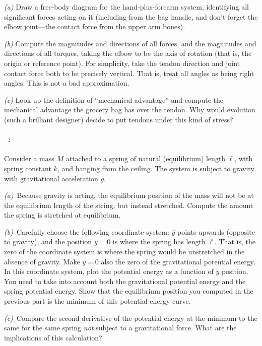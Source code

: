 \documentclass[12pt]{article}
\begin{document}
\textsl{(a)} Draw a free-body diagram for the hand-plus-forearm
system, identifying all significant forces acting on it (including
from the bag handle, and don't forget the elbow joint---the contact
force from the upper arm bones).

\textsl{(b)} Compute the magnitudes and directions of all forces, and
the magnitudes and directions of all torques, taking the elbow to be
the axis of rotation (that is, the origin or reference point).  For
simplicity, take the tendon direction and joint contact force both to
be precisely vertical.  That is, treat all angles as being right
angles.  This is not a bad approximation.

\textsl{(c)} Look up the definition of ``mechanical advantage'' and
compute the mechanical advantage the grocery bag has over the tendon.
Why would evolution (such a brilliant designer) decide to put tendons
under this kind of stress?

\paragraph{\problemname~\theproblem:}%
Consider a mass $M$ attached to a spring of natural (equilibrium)
length $\ell$, with spring constant $k$, and hanging from the
ceiling. The system is subject to gravity with gravitational
acceleration $g$.

\textsl{(a)}~Because gravity is acting, the equilibrium position of
the mass will not be at the equilibrium length of the string, but
instead stretched. Compute the amount the spring is stretched at
equilibrium.

\textsl{(b)}~Carefully choose the following coordinate system:
$\hat{y}$ points upwards (opposite to gravity), and the position $y=0$
is where the spring has length $\ell$. That is, the zero of the
coordinate system is where the spring would be unstretched in the
absence of gravity. Make $y=0$ also the zero of the gravitational
potential energy. In this coordinate system, plot the potential energy
as a function of $y$ position. You need to take into account both the
gravitational potential energy and the spring potential energy. Show
that the equilibrium position you computed in the previous part is the
minimum of this potential energy curve.

\textsl{(c)}~Compare the second derivative of the potential energy at
the minimum to the same for the same spring \emph{not} subject to a
gravitational force. What are the implications of this calculation?
\end{document}
